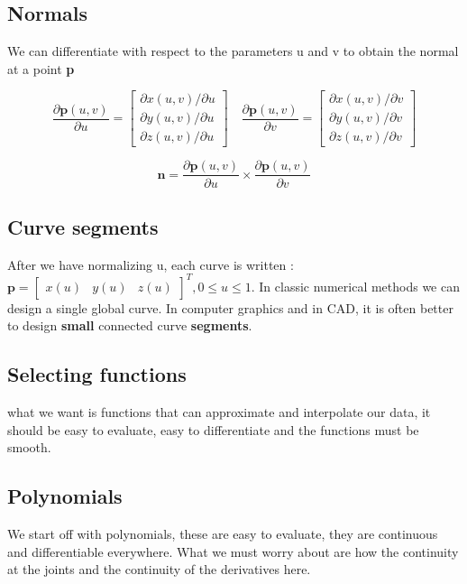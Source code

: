 	\subsection*{Normals}
	We can differentiate with respect to the parameters u and v to obtain the normal at a point \textbf{p} 

	\begin{equation}
		\frac{\partial \textbf{p}(u,v)} {\partial u} = \begin{bmatrix}  \partial x(u,v) / \partial u \\ \partial y(u,v) / \partial u  \\ \partial z(u,v) / \partial u  \end{bmatrix}  \quad
		\frac{\partial \textbf{p}(u,v)} {\partial v} = \begin{bmatrix}  \partial x(u,v) / \partial v \\ \partial y(u,v) / \partial v  \\ \partial z(u,v) / \partial v  \end{bmatrix}
	\end{equation}

	\begin{equation}
		\textbf{n} = \frac{\partial \textbf{p}(u,v)} {\partial u} \times \frac{\partial \textbf{p}(u,v)} {\partial v} 
	\end{equation}

	\subsection*{Curve segments}
	After we have normalizing u, each curve is written : $\textbf{p} = \begin{bmatrix} x(u)& y(u)& z(u) \end{bmatrix}^{T}, 0 \le u \le 1$. In classic numerical methods we can design a single global curve. In computer graphics and in CAD, it is often better to design \textbf{small} connected curve \textbf{segments}. 

	\subsection*{Selecting functions}
	what we want is functions that can approximate and interpolate our data, it should be easy to evaluate, easy to differentiate and the functions must be smooth.

	\subsection*{Polynomials}
	We start off with polynomials, these are easy to evaluate, they are continuous and differentiable everywhere. What we must worry about are how the continuity at the joints and the continuity of the derivatives here. 

